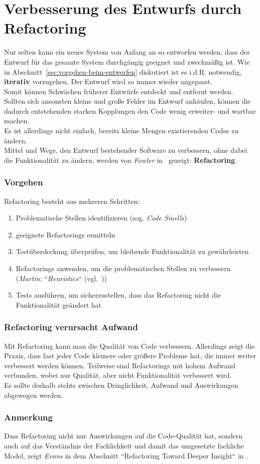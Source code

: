 \section{Verbesserung des Entwurfs durch Refactoring}
Nur selten kann ein neues System von Anfang an so entworfen werden, dass der Entwurf für das gesamte System  durchgängig geeignet und zweckmäßig ist.
Wie in Abschnitt~\ref{sec:vorgehen-beim-entwerfen} diskutiert ist es i.d.R. notwendig, \textbf{iterativ} vorzugehen.
Der Entwurf wird so immer wieder angepasst.\\
Somit können Schwächen früherer Entwürfe entdeckt und entfernt werden.\\
Sollten sich ansonsten kleine und große Fehler im Entwurf anhäufen, können die dadurch entstehenden starken Kopplungen den Code wenig erweiter- und wartbar machen.\\

\noindent
Es ist allerdings nicht einfach, bereits kleine Mengen existierenden Codes zu ändern.\\
Mittel und Wege, den Entwurf bestehender Software zu verbessern, ohne dabei die Funktionalität zu ändern, werden von \textit{Fowler} in~\cite{Fow99} gezeigt: \textbf{Refactoring}.

\subsubsection*{Vorgehen}
Refactoring besteht aus mehreren Schritten:

\begin{enumerate}
    \item Problematische Stellen identifizieren (sog. \textit{Code Smells})
    \item geeignete Refactorings ermitteln
    \item Testüberdeckung überprüfen, um bleibende Funktionalität zu gewährleisten
    \item Refactorings anwenden, um die problematischen Stellen zu verbessern (\textit{Martin}: ``\textit{Heuristics}`` (vgl.~\cite[285 ff.]{Mar08}))
    \item Tests ausführen, um sicherzustellen, dass das Refactoring nicht die Funktionalität geändert hat
\end{enumerate}

\subsubsection*{Refactoring verursacht Aufwand}
Mit Refactoring kann man die Qualität von Code verbessern.
Allerdings zeigt die Praxis, dass fast jeder Code kleinere oder größere Probleme hat, die immer weiter verbessert werden können.
Teilweise sind Refactorings mit hohem Aufwand verbunden, wobei nur Qualität, aber nicht Funktionalität verbessert wird.\\
Es sollte deshalb stehts zwischen Dringlichkeit, Aufwand und Auswirkungen abgewogen werden.

\subsubsection*{Anmerkung}
Dass Refactoring nicht nur Auswirkungen auf die Code-Qualität hat, sondern auch auf das Verständnis der Fachlichkeit und damit das umgesetzte fachliche Model, zeigt \textit{Evans} in dem Abschnitt ``Refactoring Toward Deeper Insight`` in \cite{Eva03}.